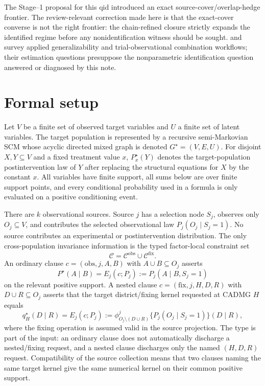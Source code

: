 \documentclass[11pt]{article}
\theoremstyle{definition}
\theoremstyle{plain}
\theoremstyle{remark}
\begin{document}
The Stage--1 proposal for this qid introduced an exact
source-cover/overlap-hedge frontier.  The review-relevant correction made
here is that the exact-cover converse is not the right frontier: the
chain-refined closure strictly expands the identified regime before any
nonidentification witness should be sought.  \cite{DegtiarRose2023Generalizability}
and \cite{ColnetEtAl2024RCTObservationalReview} survey applied
generalizability and trial-observational combination workflows; their
estimation questions presuppose the nonparametric identification question
answered or diagnosed by this note.

\section{Formal setup}
Let \(V\) be a finite set of observed target variables and \(U\) a finite set
of latent variables.  The target population is represented by a recursive
semi-Markovian SCM whose acyclic directed mixed graph is denoted
\(G^\star=(V,E,U)\).  For disjoint \(X,Y\subseteq V\) and a fixed treatment
value \(x\), \(P^\star_x(Y)\) denotes the target-population postintervention
law of \(Y\) after replacing the structural equations for \(X\) by the
constant \(x\).  All variables have finite support, all sums below are over
finite support points, and every conditional probability used in a formula is
only evaluated on a positive conditioning event.

There are \(k\) observational sources.  Source \(j\) has a selection node
\(S_j\), observes only \(O_j\subseteq V\), and contributes the selected
observational law \(P_j(O_j\mid S_j=1)\).  No source contributes an
experimental or postintervention distribution.  The only cross-population
invariance information is the typed factor-local constraint set
\[
  \mathcal C=\mathcal C^{\mathrm{obs}}\cup\mathcal C^{\mathrm{fix}}.
\]
An ordinary clause \(c=(\mathrm{obs},j,A,B)\) with \(A\cup B\subseteq O_j\)
asserts
\[
  P^\star(A\mid B)=E_j(c;P_j):=P_j(A\mid B,S_j=1)
\]
on the relevant positive support.  A nested clause
\(c=(\mathrm{fix},j,H,D,R)\) with \(D\cup R\subseteq O_j\) asserts that the
target district/fixing kernel requested at CADMG \(H\) equals
\[
  q^\star_H(D\mid R)=E_j(c;P_j)
  :=\phi^j_{O_j\setminus(D\cup R)}
        \{P_j(O_j\mid S_j=1)\}(D\mid R),
\]
where the fixing operation is assumed valid in the source projection.  The
type is part of the input: an ordinary clause does not automatically discharge
a nested/fixing request, and a nested clause discharges only the named
\((H,D,R)\) request.  Compatibility of the source collection means that two
clauses naming the same target kernel give the same numerical kernel on their
common positive support.
\end{document}
